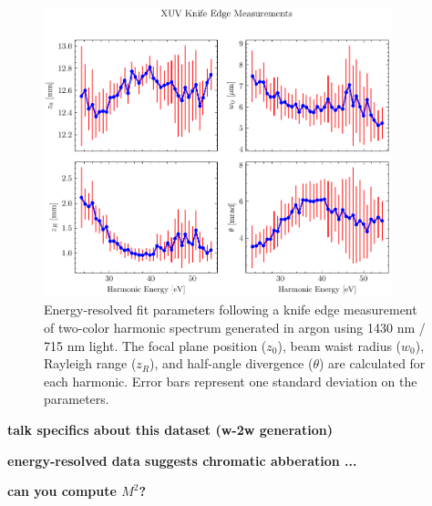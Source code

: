 \begin{figure}
	\centering
	\includegraphics[width=0.9\textwidth]{figures/chap3/knife_edge_fit_2x2.pdf}
	\caption{Energy-resolved fit parameters following a knife edge measurement of two-color harmonic spectrum generated in argon using 1430 nm / 715 nm light. The focal plane position ($z_0$), beam waist radius ($w_0$), Rayleigh range ($z_R$), and half-angle divergence ($\theta$) are calculated for each harmonic. Error bars represent one standard deviation on the parameters.}
	\label{fig:knife_edge_fit_2x2}
\end{figure}


\textbf{talk specifics about this dataset (w-2w generation)}

\textbf{energy-resolved data suggests chromatic abberation ...}

\textbf{can you compute $M^2$?}





